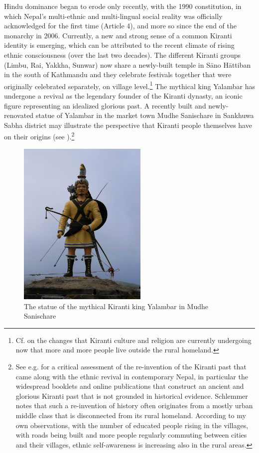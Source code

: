 Hindu dominance began to erode only recently, with the 1990 constitution, in which Nepal's multi-ethnic and multi-lingual social reality was officially acknowledged for the first time (Article 4), and more so since the end of the monarchy in 2006. Currently, a new and strong sense of a common Kiranti identity is emerging, which can be attributed to the recent climate of rising ethnic consciousness (over the last two decades). The different Kiranti groups (Limbu, Rai, Yakkha, Sunwar) now share a newly-built temple in Sāno Hāttiban in the south of Kathmandu and they celebrate festivals together that were originally celebrated separately, on
village level.\footnote{Cf. \citet{Gaenszle_Redefining} on the changes that Kiranti culture and religion are currently undergoing now that more and more people live outside the rural homeland.}  The mythical king Yalambar has undergone a revival as the legendary founder of the Kiranti dynasty, an iconic figure representing an idealized glorious past. A recently built and newly-renovated statue of Yalambar in the market town Mudhe Sanischare in Sankhuwa Sabha district may illustrate the perspective that Kiranti people themselves have on their origins (see ).\footnote{See e.g. \citet{Schlemmer2003_New} for a critical assessment of the re-invention of the Kiranti past that came along with the ethnic revival in contemporary Nepal, in particular the widespread booklets and online publications that construct an ancient and glorious Kiranti past that is not grounded in historical evidence. Schlemmer notes that such a re-invention of history often originates from a mostly urban middle class that is disconnected from its rural homeland. According to my own observations, with the number of educated people rising in the villages, with roads being built and more people regularly commuting between cities and their villages, ethnic self-awareness is increasing also in the rural areas.}

\begin{figure}
\centering
\includegraphics[height=8cm]{figures/yalambar.jpg}
\caption{The statue of the mythical Kiranti king Yalambar in Mudhe Sanischare}\label{yalambar}
\end{figure}


